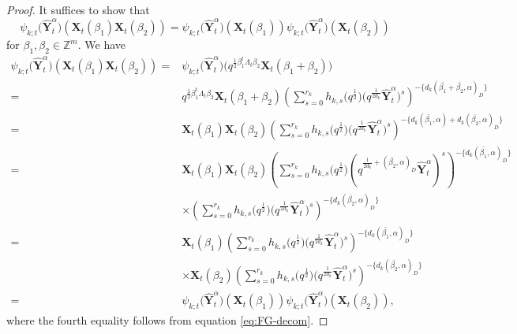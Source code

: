 \documentclass[10pt,a4paper]{amsart}
\numberwithin{equation}{section}
\begin{document}
 \begin{proof}
It suffices to show that
 \[\psi_{k;t}\bigl(\mathbf{\hat{Y}}_{t}^{\alpha}\bigr)(\mathbf{X}_{t}(\beta_1)\mathbf{X}_{t}(\beta_2))=\psi_{k;t}\bigl(\mathbf{\hat{Y}}_{t}^{\alpha}\bigr)(\mathbf{X}_{t}(\beta_1))\psi_{k;t}\bigl(\mathbf{\hat{Y}}_{t}^{\alpha}\bigr)(\mathbf{X}_{t}(\beta_2))\]
for $\beta_{1},\beta_2\in\mathbb{Z}^{m}$. We have
\begin{align*}
 \psi_{k;t}\bigl(\mathbf{\hat{Y}}_{t}^{\alpha}\bigr)(\mathbf{X}_{t}(\beta_1)\mathbf{X}_{t}(\beta_2))
 ={}&\psi_{k;t}\bigl(\mathbf{\hat{Y}}_{t}^{\alpha}\bigr)\bigl(q^{\frac{1}{2}\beta_{1}^{t}\Lambda_{t}\beta_{2}}\mathbf{X}_{t}(\beta_1+\beta_2)\bigr)\\
 ={}&q^{\frac{1}{2}\beta_{1}^{t}\Lambda_{t}\beta_{2}}\mathbf{X}_{t}(\beta_{1}+\beta_{2})\left(\sum\limits_{s=0}^{r_k} h_{k,s}\bigl(q^{\frac{1}{2}}\bigr)\bigl(q^{\frac{1}{2d_{k}}}\mathbf{\hat{Y}}_{t}^{\alpha}\bigr)^{s}\right)^{-\{d_{k}(\bar{\beta_{1}}+\bar{\beta_{2}},\alpha)_D\}}\\
 ={}&\mathbf{X}_{t}(\beta_{1})\mathbf{X}_{t}(\beta_{2})\left(\sum\limits_{s=0}^{r_k} h_{k,s}\bigl(q^{\frac{1}{2}}\bigr)\bigl(q^{\frac{1}{2d_{k}}}\mathbf{\hat{Y}}_{t}^{\alpha}\bigr)^{s}\right)^{-\{d_{k}(\bar{\beta_{1}},\alpha)+d_k(\bar{\beta_{2}},\alpha)_D\}}\\
={}&\mathbf{X}_{t}(\beta_{1})\mathbf{X}_{t}(\beta_{2})\left(\sum\limits_{s=0}^{r_k} h_{k,s}\bigl(q^{\frac{1}{2}}\bigr)(q^{\frac{1}{2d_{k}}+ (\bar{\beta_{2}},\alpha)_D}\mathbf{\hat{Y}}_{t}^{\alpha})^{s}\right)^{-\{d_{k}(\bar{\beta_{1}},\alpha)_D\}}\\
&\times\left(\sum\limits_{s=0}^{r_k} h_{k,s}\bigl(q^{\frac{1}{2}}\bigr)\bigl(q^{\frac{1}{2d_{k}}}\mathbf{\hat{Y}}_{t}^{\alpha}\bigr)^{s}\right)^{-\{d_{k}(\bar{\beta_{2}},\alpha)_D\}}\\
={}&\mathbf{X}_{t}(\beta_{1})\left(\sum\limits_{s=0}^{r_k} h_{k,s}\bigl(q^{\frac{1}{2}}\bigr)\bigl(q^{\frac{1}{2d_{k}}}\mathbf{\hat{Y}}_{t}^{\alpha}\bigr)^{s}\right)^{-\{d_{k}(\bar{\beta_{1}},\alpha)_D\}}\\
&\times\mathbf{X}_{t}(\beta_{2})\left(\sum\limits_{s=0}^{r_k} h_{k,s}\bigl(q^{\frac{1}{2}}\bigr)\bigl(q^{\frac{1}{2d_{k}}}\mathbf{\hat{Y}}_{t}^{\alpha}\bigr)^{s}\right)^{-\{d_{k}(\bar{\beta_{2}},\alpha)_D\}}\\
={}&\psi_{k;t}\bigl(\mathbf{\hat{Y}}_{t}^{\alpha}\bigr)(\mathbf{X}_{t}(\beta_1))\psi_{k;t}\bigl(\mathbf{\hat{Y}}_{t}^{\alpha}\bigr)(\mathbf{X}_{t}(\beta_2)),
\end{align*}
where the fourth equality follows from equation \eqref{eq:FG-decom}.
\end{proof}
\end{document}
